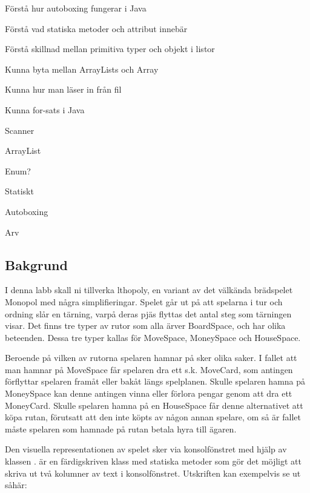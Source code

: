 

\Lab{\LabWeekELEVEN}

\begin{Goals}
\item Förstå hur autoboxing fungerar i Java
\item Förstå vad statiska metoder och attribut innebär
\item Förstå skillnad mellan primitiva typer och objekt i listor
\item Kunna byta mellan ArrayLists och Array
\item Kunna hur man läser in från fil
\item Kunna for-sats i Java
\end{Goals}

\begin{Preparations}
\item Scanner
\item ArrayList
\item Enum?
\item Statiskt
\item Autoboxing
\item Arv
\end{Preparations}

\subsection{Bakgrund}
I denna labb skall ni tillverka lthopoly, en variant av det välkända brädspelet Monopol med några simplifieringar. Spelet går ut på att spelarna i tur och ordning slår en tärning, varpå deras pjäs flyttas det antal steg som tärningen visar. Det finns tre typer av rutor som alla ärver BoardSpace, och har olika beteenden. Dessa tre typer kallas för MoveSpace, MoneySpace och HouseSpace.

Beroende på vilken av rutorna spelaren hamnar på sker olika saker. I fallet att man hamnar på MoveSpace får spelaren dra ett s.k. MoveCard, som antingen förflyttar spelaren framåt eller bakåt längs spelplanen. 
Skulle spelaren hamna på MoneySpace kan denne antingen vinna eller förlora pengar genom att dra ett MoneyCard. Skulle spelaren hamna på en HouseSpace får denne alternativet att köpa rutan, förutsatt att den inte köpts av någon annan spelare, om så är fallet måste spelaren som hamnade på rutan betala hyra till ägaren.

Den visuella representationen av spelet sker via konsolfönstret med hjälp av klassen .  är en färdigskriven klass med statiska metoder som gör det möjligt att skriva ut två kolumner av text i konsolfönstret. Utskriften kan exempelvis se ut såhär:

